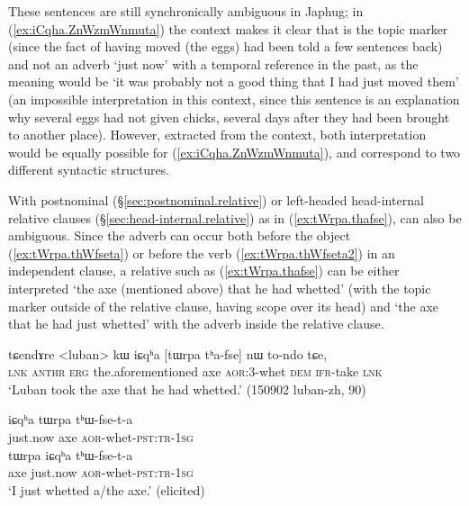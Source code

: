  These sentences are still synchronically ambiguous in Japhug; in  (\ref{ex:iCqha.ZnWzmWnmuta}) the context makes it clear that  is the topic marker (since the fact of having moved (the eggs) had been told a few sentences back) and not an adverb `just now' with a temporal reference in the past, as the meaning would be `it was probably not a good thing that I had just moved them' (an impossible interpretation in this context, since this sentence is an explanation why several eggs had not given chicks, several days after they had been brought to another place). However, extracted from the context, both interpretation would be equally possible for (\ref{ex:iCqha.ZnWzmWnmuta}), and correspond to two different syntactic structures.

With postnominal (§\ref{sec:postnominal.relative}) or left-headed head-internal relative clauses (§\ref{sec:head-internal.relative}) as in (\ref{ex:tWrpa.thafse}),  can also be ambiguous. Since the adverb  can occur both before the object (\ref{ex:tWrpa.thWfseta}) or before the verb (\ref{ex:tWrpa.thWfseta2}) in an independent clause, a relative such as (\ref{ex:tWrpa.thafse}) can be either interpreted `the axe (mentioned above) that he had whetted' (with the topic marker  outside of the relative clause, having scope over its head) and `the axe that he had just whetted' with the adverb  inside the relative clause.

 \begin{exe}
\ex \label{ex:tWrpa.thafse}
 \gll  tɕendɤre <luban> kɯ iɕqʰa [tɯrpa tʰa-fse] nɯ to-ndo tɕe, \\
 \textsc{lnk}  \textsc{anthr} \textsc{erg} the.aforementioned axe \textsc{aor}:3\flobv{}-whet \textsc{dem} \textsc{ifr}-take \textsc{lnk} \\
 \glt `Luban took the axe that he had whetted.' (150902 luban-zh, 90)
 \end{exe}

  \begin{exe}
  \ex 
  \begin{xlist}
\ex \label{ex:tWrpa.thWfseta}
 \gll   iɕqʰa tɯrpa tʰɯ-fse-t-a \\
just.now axe \textsc{aor}-whet-\textsc{pst}:\textsc{tr}-\textsc{1sg} \\
\ex \label{ex:tWrpa.thWfseta2}
 \gll   tɯrpa  iɕqʰa tʰɯ-fse-t-a \\
 axe just.now \textsc{aor}-whet-\textsc{pst}:\textsc{tr}-\textsc{1sg} \\
 \glt `I just whetted a/the axe.' (elicited)
 \end{xlist}
 \end{exe}

